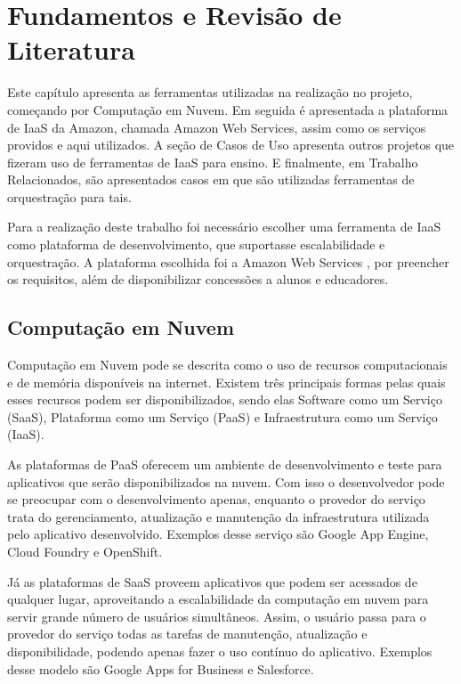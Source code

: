 \documentclass[tg]{mdtufsm}
\begin{document}
\chapter{Fundamentos e Revisão de Literatura}

Este capítulo apresenta as ferramentas utilizadas na realização no projeto, começando por Computação em Nuvem. Em seguida é apresentada a plataforma de IaaS da Amazon, chamada Amazon Web Services, assim como os serviços providos e aqui utilizados. A seção de Casos de Uso apresenta outros projetos que fizeram uso de ferramentas de IaaS para ensino. E finalmente, em Trabalho Relacionados, são apresentados casos em que são utilizadas ferramentas de orquestração para tais.

Para a realização deste trabalho foi necessário escolher uma ferramenta de IaaS como plataforma de desenvolvimento, que suportasse escalabilidade e orquestração. A plataforma escolhida foi a Amazon Web Services \cite{aws}, por preencher os requisitos, além de disponibilizar concessões a alunos e educadores.

\section{Computação em Nuvem}


Computação em Nuvem pode se descrita como o uso de recursos computacionais e de memória disponíveis na internet. Existem três principais formas pelas quais esses recursos podem ser disponibilizados, sendo elas Software como um Serviço (SaaS), Plataforma como um Serviço (PaaS) e Infraestrutura como um Serviço (IaaS).

As plataformas de PaaS oferecem um ambiente de desenvolvimento e teste para aplicativos que serão disponibilizados na nuvem. Com isso o desenvolvedor pode se preocupar com o desenvolvimento apenas, enquanto o provedor do serviço trata do gerenciamento, atualização e manutenção da infraestrutura utilizada pelo aplicativo desenvolvido. Exemplos desse serviço são Google App Engine, Cloud Foundry e OpenShift.

Já as plataformas de SaaS proveem aplicativos que podem ser acessados de qualquer lugar, aproveitando a escalabilidade da computação em nuvem para servir grande número de usuários simultâneos. Assim, o usuário passa para o provedor do serviço todas as tarefas de manutenção, atualização e disponibilidade, podendo apenas fazer o uso contínuo do aplicativo. Exemplos desse modelo são Google Apps for Business e Salesforce.
\end{document}
